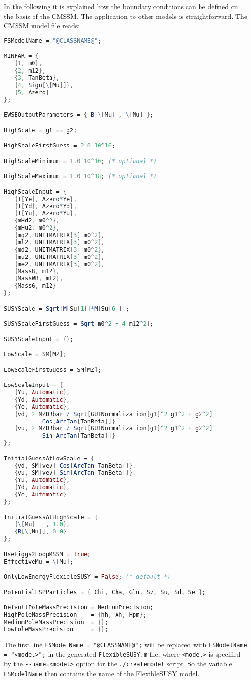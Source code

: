 \documentclass[final,3p,11pt,pdflatex]{elsarticle}
\makeatletter
\newcommand{\fs}{FlexibleSUSY\@\xspace}
\newcommand{\code}[1]{\lstinline|#1|}  %
\makeatother
\begin{document}
In the following it is explained how the
boundary conditions can be defined on the basis of the CMSSM.  The
application to other models is straightforward.  The CMSSM model file
reads:
%
\begin{lstlisting}[language=Mathematica]
FSModelName = "@CLASSNAME@";

MINPAR = {
   {1, m0},
   {2, m12},
   {3, TanBeta},
   {4, Sign[\[Mu]]},
   {5, Azero}
};

EWSBOutputParameters = { B[\[Mu]], \[Mu] };

HighScale = g1 == g2;

HighScaleFirstGuess = 2.0 10^16;

HighScaleMinimum = 1.0 10^10; (* optional *)

HighScaleMaximum = 1.0 10^18; (* optional *)

HighScaleInput = {
   {T[Ye], Azero*Ye},
   {T[Yd], Azero*Yd},
   {T[Yu], Azero*Yu},
   {mHd2, m0^2},
   {mHu2, m0^2},
   {mq2, UNITMATRIX[3] m0^2},
   {ml2, UNITMATRIX[3] m0^2},
   {md2, UNITMATRIX[3] m0^2},
   {mu2, UNITMATRIX[3] m0^2},
   {me2, UNITMATRIX[3] m0^2},
   {MassB, m12},
   {MassWB, m12},
   {MassG, m12}
};

SUSYScale = Sqrt[M[Su[1]]*M[Su[6]]];

SUSYScaleFirstGuess = Sqrt[m0^2 + 4 m12^2];

SUSYScaleInput = {};

LowScale = SM[MZ];

LowScaleFirstGuess = SM[MZ];

LowScaleInput = {
   {Yu, Automatic},
   {Yd, Automatic},
   {Ye, Automatic},
   {vd, 2 MZDRbar / Sqrt[GUTNormalization[g1]^2 g1^2 + g2^2]
           Cos[ArcTan[TanBeta]]},
   {vu, 2 MZDRbar / Sqrt[GUTNormalization[g1]^2 g1^2 + g2^2]
           Sin[ArcTan[TanBeta]]}
};

InitialGuessAtLowScale = {
   {vd, SM[vev] Cos[ArcTan[TanBeta]]},
   {vu, SM[vev] Sin[ArcTan[TanBeta]]},
   {Yu, Automatic},
   {Yd, Automatic},
   {Ye, Automatic}
};

InitialGuessAtHighScale = {
   {\[Mu]   , 1.0},
   {B[\[Mu]], 0.0}
};

UseHiggs2LoopMSSM = True;
EffectiveMu = \[Mu];

OnlyLowEnergyFlexibleSUSY = False; (* default *)

PotentialLSPParticles = { Chi, Cha, Glu, Sv, Su, Sd, Se };

DefaultPoleMassPrecision = MediumPrecision;
HighPoleMassPrecision    = {hh, Ah, Hpm};
MediumPoleMassPrecision  = {};
LowPoleMassPrecision     = {};
\end{lstlisting}
%
The first line \code{FSModelName = "@CLASSNAME@";} will be replaced
with \code{FSModelName = "<model>";} in the generated
\code{FlexibleSUSY.m} file, where \code{<model>} is specified by the
\code{--name=<model>} option for the \code{./createmodel} script.  So
the variable \code{FSModelName} then contains the name of the \fs
model.
\end{document}
